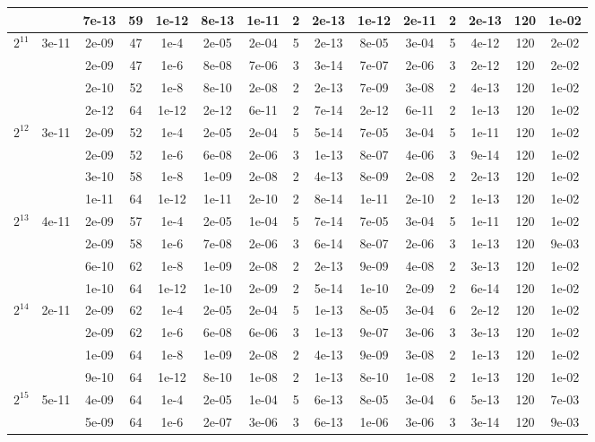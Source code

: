 \documentclass[11pt]{article}
\begin{document}
\begin{table}[!htbp]
\begin{tabular}{|c|c|c|c|c|c|c|c|c|c|c|c|c|c|c|}
~ & ~ & 7e-13 & 59 & 1e-12 & 8e-13 & 1e-11 & 2 & 2e-13 & 1e-12 & 2e-11 & 2 & 2e-13 & 120 & 1e-02\\
\hline
$2^{11}$ & 3e-11 & 2e-09 & 47 & 1e-4 & 2e-05 & 2e-04 & 5 & 2e-13 & 8e-05 & 3e-04 & 5 & 4e-12 & 120 & 2e-02\\
~ & ~ & 2e-09 & 47 & 1e-6 & 8e-08 & 7e-06 & 3 & 3e-14 & 7e-07 & 2e-06 & 3 & 2e-12 & 120 & 2e-02\\
~ & ~ & 2e-10 & 52 & 1e-8 & 8e-10 & 2e-08 & 2 & 2e-13 & 7e-09 & 3e-08 & 2 & 4e-13 & 120 & 1e-02\\
~ & ~ & 2e-12 & 64 & 1e-12 & 2e-12 & 6e-11 & 2 & 7e-14 & 2e-12 & 6e-11 & 2 & 1e-13 & 120 & 1e-02\\
\hline
$2^{12}$ & 3e-11 & 2e-09 & 52 & 1e-4 & 2e-05 & 2e-04 & 5 & 5e-14 & 7e-05 & 3e-04 & 5 & 1e-11 & 120 & 1e-02\\
~ & ~ & 2e-09 & 52 & 1e-6 & 6e-08 & 2e-06 & 3 & 1e-13 & 8e-07 & 4e-06 & 3 & 9e-14 & 120 & 1e-02\\
~ & ~ & 3e-10 & 58 & 1e-8 & 1e-09 & 2e-08 & 2 & 4e-13 & 8e-09 & 2e-08 & 2 & 2e-13 & 120 & 1e-02\\
~ & ~ & 1e-11 & 64 & 1e-12 & 1e-11 & 2e-10 & 2 & 8e-14 & 1e-11 & 2e-10 & 2 & 1e-13 & 120 & 1e-02\\
\hline
$2^{13}$ & 4e-11 & 2e-09 & 57 & 1e-4 & 2e-05 & 1e-04 & 5 & 7e-14 & 7e-05 & 3e-04 & 5 & 1e-11 & 120 & 1e-02\\
~ & ~ & 2e-09 & 58 & 1e-6 & 7e-08 & 2e-06 & 3 & 6e-14 & 8e-07 & 2e-06 & 3 & 1e-13 & 120 & 9e-03\\
~ & ~ & 6e-10 & 62 & 1e-8 & 1e-09 & 2e-08 & 2 & 2e-13 & 9e-09 & 4e-08 & 2 & 3e-13 & 120 & 1e-02\\
~ & ~ & 1e-10 & 64 & 1e-12 & 1e-10 & 2e-09 & 2 & 5e-14 & 1e-10 & 2e-09 & 2 & 6e-14 & 120 & 1e-02\\
\hline
$2^{14}$ & 2e-11 & 2e-09 & 62 & 1e-4 & 2e-05 & 2e-04 & 5 & 1e-13 & 8e-05 & 3e-04 & 6 & 2e-12 & 120 & 1e-02\\
~ & ~ & 2e-09 & 62 & 1e-6 & 6e-08 & 6e-06 & 3 & 1e-13 & 9e-07 & 3e-06 & 3 & 3e-13 & 120 & 1e-02\\
~ & ~ & 1e-09 & 64 & 1e-8 & 1e-09 & 2e-08 & 2 & 4e-13 & 9e-09 & 3e-08 & 2 & 1e-13 & 120 & 1e-02\\
~ & ~ & 9e-10 & 64 & 1e-12 & 8e-10 & 1e-08 & 2 & 1e-13 & 8e-10 & 1e-08 & 2 & 1e-13 & 120 & 1e-02\\
\hline
$2^{15}$ & 5e-11 & 4e-09 & 64 & 1e-4 & 2e-05 & 1e-04 & 5 & 6e-13 & 8e-05 & 3e-04 & 6 & 5e-13 & 120 & 7e-03\\
~ & ~ & 5e-09 & 64 & 1e-6 & 2e-07 & 3e-06 & 3 & 6e-13 & 1e-06 & 3e-06 & 3 & 3e-14 & 120 & 9e-03\\

\end{tabular}
\end{table}
\end{document}
